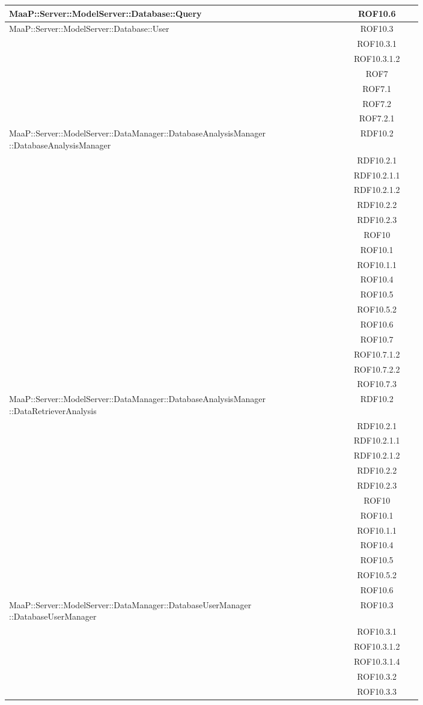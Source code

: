 \begin{center}
\begin{longtable}{|p{0.8\linewidth}|c|}
\midrule
MaaP::Server::ModelServer::Database::Query
& ROF10.6\\

\midrule
MaaP::Server::ModelServer::Database::User
& ROF10.3\\
& ROF10.3.1\\
& ROF10.3.1.2\\
& ROF7\\
& ROF7.1\\
& ROF7.2\\
& ROF7.2.1\\

\midrule
MaaP::Server::ModelServer::DataManager::DatabaseAnalysisManager ::DatabaseAnalysisManager
& RDF10.2\\
& RDF10.2.1\\
& RDF10.2.1.1\\
& RDF10.2.1.2\\
& RDF10.2.2\\
& RDF10.2.3\\
& ROF10\\
& ROF10.1\\
& ROF10.1.1\\
& ROF10.4\\
& ROF10.5\\
& ROF10.5.2\\
& ROF10.6\\
& ROF10.7\\
& ROF10.7.1.2\\
& ROF10.7.2.2\\
& ROF10.7.3\\

\midrule
MaaP::Server::ModelServer::DataManager::DatabaseAnalysisManager ::DataRetrieverAnalysis
& RDF10.2\\
& RDF10.2.1\\
& RDF10.2.1.1\\
& RDF10.2.1.2\\
& RDF10.2.2\\
& RDF10.2.3\\
& ROF10\\
& ROF10.1\\
& ROF10.1.1\\
& ROF10.4\\
& ROF10.5\\
& ROF10.5.2\\
& ROF10.6\\

\midrule
MaaP::Server::ModelServer::DataManager::DatabaseUserManager ::DatabaseUserManager
& ROF10.3\\
& ROF10.3.1\\
& ROF10.3.1.2\\
& ROF10.3.1.4\\
& ROF10.3.2\\
& ROF10.3.3\\


\end{longtable}
\end{center}
